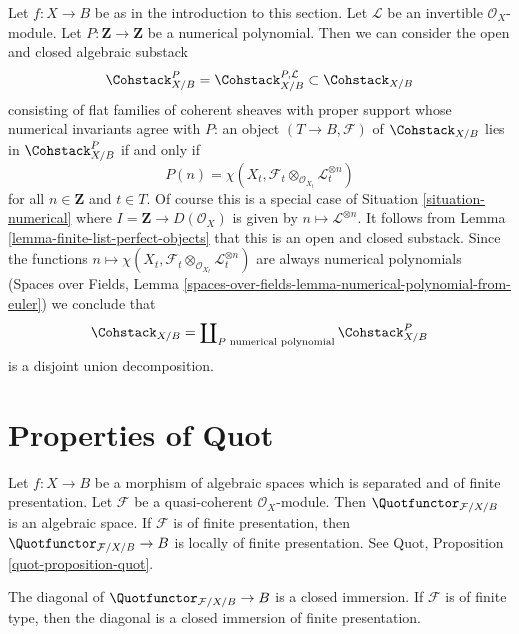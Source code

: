 \begin{example}
\label{example-hilbert-polynomial}
Let $f : X \to B$ be as in the introduction to this section.
Let $\mathcal{L}$ be an invertible $\mathcal{O}_X$-module.
Let $P : \mathbf{Z} \to \mathbf{Z}$ be a numerical polynomial.
Then we can consider the open and closed algebraic substack
$$
\Cohstack^P_{X/B} =
\Cohstack^{P, \mathcal{L}}_{X/B}
\subset \Cohstack_{X/B}
$$
consisting of flat families of coherent sheaves with proper support
whose numerical invariants agree with $P$: an object
$(T \to B, \mathcal{F})$ of $\Cohstack_{X/B}$ lies in
$\Cohstack^P_{X/B}$ if and only if
$$
P(n) =
\chi(X_t, \mathcal{F}_t \otimes_{\mathcal{O}_{X_t}} \mathcal{L}_t^{\otimes n})
$$
for all $n \in \mathbf{Z}$ and $t \in T$. Of course this is a
special case of Situation \ref{situation-numerical}
where $I = \mathbf{Z} \to D(\mathcal{O}_X)$ is given by
$n \mapsto \mathcal{L}^{\otimes n}$. It follows from
Lemma \ref{lemma-finite-list-perfect-objects}
that this is an open and closed substack. Since the functions
$n \mapsto
\chi(X_t, \mathcal{F}_t \otimes_{\mathcal{O}_{X_t}} \mathcal{L}_t^{\otimes n})$
are always numerical polynomials (Spaces over Fields, Lemma
\ref{spaces-over-fields-lemma-numerical-polynomial-from-euler})
we conclude that
$$
\Cohstack_{X/B} = \coprod\nolimits_{P\text{ numerical polynomial}}
\Cohstack^P_{X/B}
$$
is a disjoint union decomposition.
\end{example}







\section{Properties of Quot}
\label{section-quot}

\noindent
Let $f : X \to B$ be a morphism of algebraic spaces which is
separated and of finite presentation. Let $\mathcal{F}$ be a
quasi-coherent $\mathcal{O}_X$-module. Then
$\Quotfunctor_{\mathcal{F}/X/B}$ is an algebraic space.
If $\mathcal{F}$ is of finite presentation, then
$\Quotfunctor_{\mathcal{F}/X/B} \to B$ is locally of finite
presentation. See Quot, Proposition \ref{quot-proposition-quot}.

\begin{lemma}
\label{lemma-quot-diagonal-closed}
The diagonal of $\Quotfunctor_{\mathcal{F}/X/B} \to B$ is a closed immersion.
If $\mathcal{F}$ is of finite type, then the diagonal is a closed
immersion of finite presentation.
\end{lemma}

